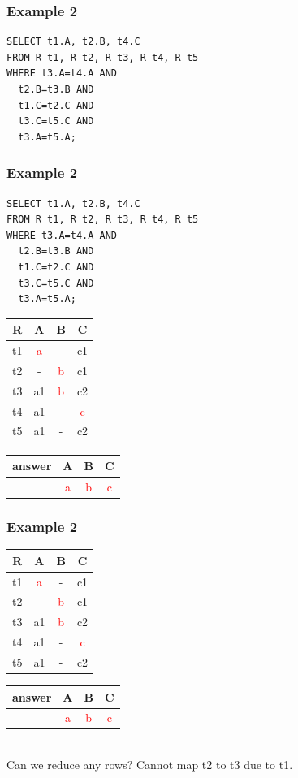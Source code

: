 \documentclass{beamer}
\begin{document}
\begin{frame}[fragile]
  \frametitle{Example 2}
\begin{verbatim}  
SELECT t1.A, t2.B, t4.C
FROM R t1, R t2, R t3, R t4, R t5
WHERE t3.A=t4.A AND
  t2.B=t3.B AND
  t1.C=t2.C AND
  t3.C=t5.C AND
  t3.A=t5.A;
\end{verbatim}  
\end{frame}

\begin{frame}[fragile]
  \frametitle{Example 2}
\begin{verbatim}  
SELECT t1.A, t2.B, t4.C
FROM R t1, R t2, R t3, R t4, R t5
WHERE t3.A=t4.A AND
  t2.B=t3.B AND
  t1.C=t2.C AND
  t3.C=t5.C AND
  t3.A=t5.A;
\end{verbatim} 
  \begin{tabular}{ c | c c c}
  R & A & B & C \\
  \hline
  t1 & \textcolor{red}{a}  & -  & c1 \\
  t2 & -  & \textcolor{red}{b}  & c1 \\
  t3 & a1 & \textcolor{red}{b} & c2 \\
  t4 & a1 & - & \textcolor{red}{c} \\
  t5 & a1 & - & c2 \\
  \end{tabular}
  \begin{tabular}{ c | c c c}
  answer & A & B & C \\
  \hline
   & \textcolor{red}{a}& \textcolor{red}{b}& \textcolor{red}{c}\\
  \end{tabular}
\end{frame}

\begin{frame}
  \frametitle{Example 2}
  \begin{tabular}{ c | c c c}
  R & A & B & C \\
  \hline
  t1 & \textcolor{red}{a}  & -  & c1 \\
  t2 & -  & \textcolor{red}{b}  & c1 \\
  t3 & a1 & \textcolor{red}{b} & c2 \\
  t4 & a1 & - & \textcolor{red}{c} \\
  t5 & a1 & - & c2 \\
  \end{tabular}
  \begin{tabular}{ c | c c c}
  answer & A & B & C \\
  \hline
   & \textcolor{red}{a}& \textcolor{red}{b}& \textcolor{red}{c}\\
  \end{tabular}
  \hfill \\
  Can we reduce any rows? Cannot map t2 to t3 due to t1. 
\end{frame}
\end{document}
